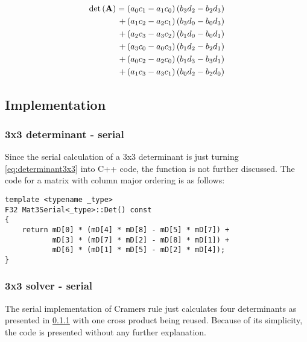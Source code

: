 \begin{align}
\mathrm{det}\left(\mathbf{A}\right)
= \left(a_0c_1 - a_1c_0\right) \left(b_3d_2 - b_2d_3\right) \nonumber\\
+ \left(a_1c_2 - a_2c_1\right) \left(b_3d_0 - b_0d_3\right) \nonumber\\ 
+ \left(a_2c_3 - a_3c_2\right) \left(b_1d_0 - b_0d_1\right) \nonumber\\
+ \left(a_3c_0 - a_0c_3\right) \left(b_1d_2 - b_2d_1\right) \nonumber\\
+ \left(a_0c_2 - a_2c_0\right) \left(b_1d_3 - b_3d_1\right) \nonumber\\
+ \left(a_1c_3 - a_3c_1\right) \left(b_0d_2 - b_2d_0\right) \label{eq:determinant4x4AVX}
\end{align}




\newpage
\subsection{Implementation}
\subsubsection{3x3 determinant - serial}
\label{sec:determinant3x3Serial}

Since the serial calculation of a 3x3 determinant is just turning \cref{eq:determinant3x3} into C++ code, the function is not further discussed.
The code for a matrix with column major ordering is as follows:

\begin{verbatim}
template <typename _type>
F32 Mat3Serial<_type>::Det() const
{
    return mD[0] * (mD[4] * mD[8] - mD[5] * mD[7]) + 
           mD[3] * (mD[7] * mD[2] - mD[8] * mD[1]) +
           mD[6] * (mD[1] * mD[5] - mD[2] * mD[4]);
}
\end{verbatim}




\newpage
\subsubsection{3x3 solver - serial}
\label{sec:cramerSolver3x3Serial}

The serial implementation of Cramers rule just calculates four determinants as presented in \cref{sec:determinant3x3Serial} with one cross product being reused.
Because of its simplicity, the code is presented without any further explanation.


